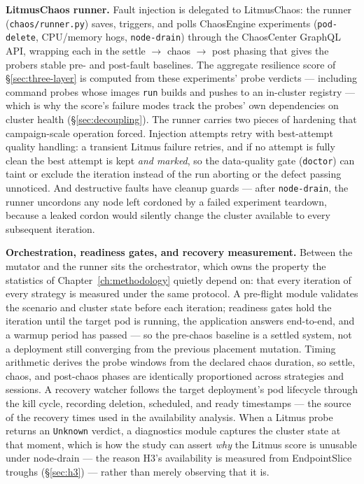 \textbf{LitmusChaos runner.} Fault injection is delegated to LitmusChaos: the
runner (\texttt{chaos/runner.py}) saves, triggers, and polls ChaosEngine experiments
(\texttt{pod-delete}, CPU/memory hogs, \texttt{node-drain}) through the ChaosCenter GraphQL
API, wrapping each in the settle $\rightarrow$ chaos $\rightarrow$ post phasing that gives the
probers stable pre- and post-fault baselines. The aggregate resilience
score of \S\ref{sec:three-layer} is computed from these experiments' probe verdicts ---
including command probes whose images \texttt{run} builds and pushes to an
in-cluster registry --- which is why the score's failure modes track the
probes' own dependencies on cluster health (\S\ref{sec:decoupling}). The runner carries two pieces
of hardening that campaign-scale operation forced. Injection attempts retry
with best-attempt quality handling: a transient Litmus failure retries, and
if no attempt is fully clean the best attempt is kept \emph{and marked}, so the
data-quality gate (\texttt{doctor}) can taint or exclude the iteration instead of
the run aborting or the defect passing unnoticed. And destructive faults have
cleanup guards --- after \texttt{node-drain}, the runner uncordons any node left
cordoned by a failed experiment teardown, because a leaked cordon would
silently change the cluster available to every subsequent iteration.

\textbf{Orchestration, readiness gates, and recovery measurement.} Between the
mutator and the runner sits the orchestrator, which owns the property the
statistics of Chapter~\ref{ch:methodology} quietly depend on: that every iteration of every
strategy is measured under the same protocol. A pre-flight module validates
the scenario and cluster state before each iteration; readiness gates hold
the iteration until the target pod is running, the application answers
end-to-end, and a warmup period has passed --- so the pre-chaos baseline is a
settled system, not a deployment still converging from the previous
placement mutation. Timing arithmetic derives the probe windows from the
declared chaos duration, so settle, chaos, and post-chaos phases are
identically proportioned across strategies and sessions. A recovery watcher
follows the target deployment's pod lifecycle through the kill cycle,
recording deletion, scheduled, and ready timestamps --- the source of the
recovery times used in the availability analysis. When a Litmus probe returns
an \texttt{Unknown} verdict, a diagnostics module captures the cluster state at
that moment, which is how the study can assert \emph{why} the Litmus score is
unusable under node-drain --- the reason H3's availability is measured from
EndpointSlice troughs (\S\ref{sec:h3}) --- rather than merely observing that it
is.

